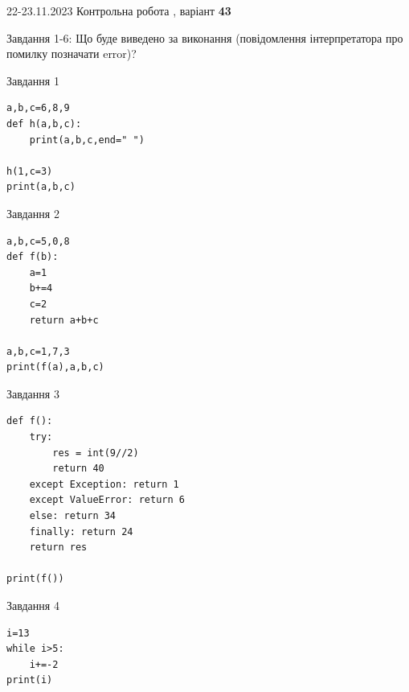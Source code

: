 \documentclass[12pt, ukrainian]{article}
\begin{document}
{{22-23.11.2023 Контрольна робота , варіант  \No \textbf { 43 }\par}}
{

Завдання 1-6: Що буде виведено за виконання (повідомлення інтерпретатора про помилку позначати error)?


\begin{minipage}[t]{9.7cm}                
{\begin{center}Завдання {1}\end{center}}
\begin{verbatim}
a,b,c=6,8,9
def h(a,b,c):
    print(a,b,c,end=" ")

h(1,c=3)
print(a,b,c)
\end{verbatim}     
\end{minipage}
\vline \hspace{8mm}
\begin{minipage}[t]{8.0cm}                
{\begin{center}Завдання {2}\end{center}}
\begin{verbatim}
a,b,c=5,0,8
def f(b):
    a=1
    b+=4
    c=2
    return a+b+c

a,b,c=1,7,3
print(f(a),a,b,c)
\end{verbatim}     
\end{minipage}

\vspace{15mm}
\begin{minipage}[t]{9.7cm}                
{\begin{center}Завдання {3}\end{center}}
\begin{verbatim}
def f():
    try:
        res = int(9//2)
        return 40
    except Exception: return 1
    except ValueError: return 6
    else: return 34
    finally: return 24
    return res

print(f())
\end{verbatim}     
\end{minipage}
\vline \hspace{8mm}
\begin{minipage}[t]{8.0cm}                
{\begin{center}Завдання {4}\end{center}}
\begin{verbatim}
i=13
while i>5:
    i+=-2
print(i)
\end{verbatim}     
\end{minipage}

}
\end{document}
